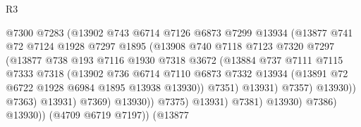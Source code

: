 \begin{lexlean}{R3}
\begin{coremodule}
                                  @7300
                                  @7283
                                  (@13902
                                    @743
                                    @6714
                                    @7126
                                    @6873
                                    @7299
                                    @13934
                                    (@13877
                                      @741
                                      @72
                                      @7124
                                      @1928
                                      @7297
                                      @1895
                                      (@13908
                                        @740
                                        @7118
                                        @7123
                                        @7320
                                        @7297
                                        (@13877
                                          @738
                                          @193
                                          @7116
                                          @1930
                                          @7318
                                          @3672
                                          (@13884
                                            @737
                                            @7111
                                            @7115
                                            @7333
                                            @7318
                                            (@13902
                                              @736
                                              @6714
                                              @7110
                                              @6873
                                              @7332
                                              @13934
                                              (@13891 @72 @6722 @1928 @6984 @1895 @13938 @13930))
                                            @7351)
                                          @13931)
                                        @7357)
                                      @13930))
                                  @7363)
                                @13931)
                              @7369)
                            @13930))
                        @7375)
                      @13931)
                    @7381)
                  @13930)
                @7386)
              @13930))
          (@4709 @6719 @7197))
        (@13877

\end{coremodule}
\end{lexlean}
